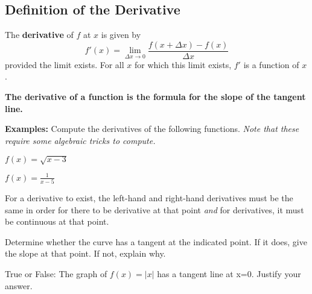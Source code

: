 \documentclass[addpoints, 12pt]{exam}
\begin{document}
\subsection*{Definition of the Derivative}
\begin{tcolorbox}[title= DEFINITION OF THE DERIVATIVE OF A FUNCTION,black,sharp corners,colback=white,colbacktitle=white,coltitle=black,boxrule=1pt]

    The \textbf{derivative} of $f$ at $x$ is given by
    \[f'(x)=\lim_{\Delta x\to0}\frac{f(x+\Delta x)-f(x)}{\Delta x}\]
    provided the limit exists. For all $x$ for which this limit exists, $f'$ is a function of $x$.
    
\end{tcolorbox}
\vspace{.15cm}
\begin{center}
    \textbf{The derivative of a function is the formula for the slope of the tangent line.}
\end{center}
\noindent\textbf{Examples:} Compute the derivatives of the following functions. \textit{Note that these require some algebraic tricks to compute.}
\begin{questions}
    \question $\displaystyle f(x)=\sqrt{x-3}$
    
    \question $\displaystyle f(x)=\frac{1}{x-5}$
\end{questions}

\newpage

For a derivative to exist, the left-hand and right-hand derivatives must be the same in order for there to be derivative at that point \textit{and} for derivatives, it must be continuous at that point.
\begin{questions}
    \question Determine whether the curve has a tangent at the indicated point. If it does, give the slope at that point. If not, explain why.
    \question True or False: The graph of $f(x)=|x|$ has a tangent line at x=0. Justify your answer.
\end{questions}
\end{document}

